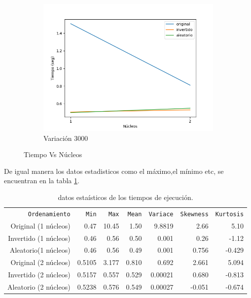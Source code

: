 \documentclass{article}
\begin{document}
\begin{figure}[h!]
\begin{subfigure}[b]{0.45\linewidth}
           \includegraphics[width=\linewidth]{Figure_1.1(3000).png}
           \caption{Variaci\'on 3000}
           \label{fig:westminster_aerea}
        \end{subfigure}
        \caption{Tiempo Vs N\'ucleos}
        \label{fig:westminster}
\end{figure}

De igual manera los datos estadisticos como el m\'aximo,el m\'inimo etc, se encuentran en la tabla \ref{t1}.

\begin{table} 
 \caption{datos esta\'isticos de los tiempos de ejecuci\'on.}
 \label{t1}
 \begin{center}
 \begin{tabular}{rrrrrrr}
\texttt{Ordenamiento} & \texttt{Min} & \texttt{Max} &\texttt{Mean} & \texttt{Variace}  & \texttt{Skewness} & \texttt{Kurtosis} \\
Original (1  n\'ucleos) & 0.47 &10.45  & 1.50 & 9.8819 & 2.66 & 5.10 \\ 
Invertido (1  n\'ucleos) & 0.46 & 0.56 & 0.50 & 0.001 & 0.26 & -1.12\\ 
Aleatorio(1 n\'ucleos) & 0.46& 0.56 & 0.49 & 0.001 & 0.756 & -0.429 \\ 
Original (2 n\'ucleos) &0.5105  &3.177  & 0.810 &0.692  &2.661 &5.094  \\ 
Invertido (2 n\'ucleos) & 0.5157 &0.557 & 0.529 &  0.00021&0.680 & -0.813 \\ 
Aleatorio (2 n\'ucleos) & 0.5238 &0.576  & 0.549 &0.00027  & -0.051 & -0.674 \\ 
\end{tabular}
\end{center}
\end{table}
\end{document}

